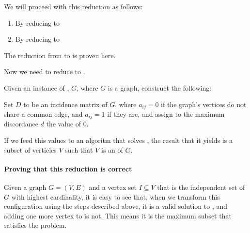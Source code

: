 We will proceed with this reduction as follows:
\begin{enumerate}
  \item By reducing \tsat{} to \is{}
  \item By reducing \is{} to \exc
\end{enumerate}
The reduction from \tsat{} to \is{} is proven here\cite{algorithms-is-proof}.

Now we need to reduce \is{} to \exc{}.

Given an instance of \is{}, $G$, where $G$ is a graph, construct the following:

Set $D$ to be an incidence matrix of $G$, where $a_{ij}=0$ if the graph's vertices do not share a common edge, and $a_{ij}=1$ if they are, and assign to the maximum discordance $d$ the value of 0.

If we feed this values to an algoritm that solves \exc{}, the result that it yields is a subset of verticies $V$ such that $V$ is an \is{} of $G$.

\paragraph{Proving that this reduction is correct}
Given a graph $G = (V,E)$ and a vertex set $I \subseteq V$ that is the independent set of $G$ with highest cardinality, it is easy to see that, when we transform this configuration using the steps described above, it is a valid solution to \exc{}, and adding one more vertex to is not. This means it is the maximum subset that satisfies the problem.
